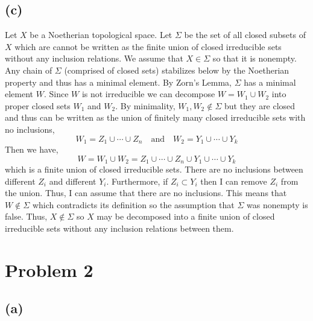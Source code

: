 \documentclass[12pt]{extarticle}
\begin{document}
\subsection*{(c)}

Let $X$ be a Noetherian topological space. Let $\Sigma$ be the set of all closed subsets of $X$ which are cannot be written as the finite union of closed irreducible sets without any inclusion relations. We assume that $X \in \Sigma$ so that it is nonempty. Any chain of $\Sigma$ (comprised of closed sets) stabilizes below by the Noetherian property and thus has a minimal element. By Zorn's Lemma, $\Sigma$ has a minimal element $W$. Since $W$ is not irreducible we can decompose $W = W_1 \cup W_2$ into proper closed sets $W_1$ and $W_2$. By minimality, $W_1, W_2 \notin \Sigma$ but they are closed and thus can be written as the union of finitely many closed irreducible sets with no inclusions,
\[ W_1 = Z_1 \cup \cdots \cup Z_n \quad \text{and} \quad W_2 = Y_1 \cup \cdots \cup  Y_k \]
Then we have,  
\[ W = W_1 \cup W_2 = Z_1 \cup \cdots \cup Z_n \cup Y_1 \cup \cdots \cup Y_k \]
which is a finite union of closed irreducible sets. There are no inclusions between different $Z_i$ and different $Y_i$. Furthermore, if $Z_i \subset Y_i$ then I can remove $Z_i$ from the union. Thus, I can assume that there are no inclusions. This means that $W \notin \Sigma$ which contradicts its definition so the assumption that $\Sigma$ was nonempty is false. Thus, $X \notin \Sigma$ so $X$ may be decomposed into a finite union of closed irreducible sets without any inclusion relations between them.

\section*{Problem 2}

\subsection*{(a)}
\end{document}
